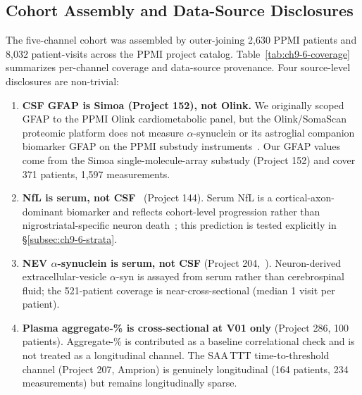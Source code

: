 \subsection{Cohort Assembly and Data-Source Disclosures}
\label{subsec:ch9-6-cohort}

The five-channel cohort was assembled by outer-joining 2,630 PPMI patients and 8,032 patient-visits across the PPMI project catalog. Table~\ref{tab:ch9-6-coverage} summarizes per-channel coverage and data-source provenance. Four source-level disclosures are non-trivial:

\begin{enumerate}
\item \textbf{CSF GFAP is Simoa (Project 152), not Olink.} We originally scoped GFAP to the PPMI Olink cardiometabolic panel, but the Olink/SomaScan proteomic platform does not measure $\alpha$-synuclein or its astroglial companion biomarker GFAP on the PPMI substudy instruments~\cite{rutledge2024}. Our GFAP values come from the Simoa single-molecule-array substudy (Project 152) and cover 371 patients, 1,597 measurements.
\item \textbf{NfL is serum, not CSF}~\cite{backstrom2020nfl} (Project 144). Serum NfL is a cortical-axon-dominant biomarker and reflects cohort-level progression rather than nigrostriatal-specific neuron death~\cite{sampedro2020nfl}; this prediction is tested explicitly in \S\ref{subsec:ch9-6-strata}.
\item \textbf{NEV $\alpha$-synuclein is serum, not CSF} (Project 204,~\cite{yan2023nev}). Neuron-derived extracellular-vesicle $\alpha$-syn is assayed from serum rather than cerebrospinal fluid; the 521-patient coverage is near-cross-sectional (median 1 visit per patient).
\item \textbf{Plasma aggregate-\% is cross-sectional at V01 only} (Project 286, 100 patients). Aggregate-\% is contributed as a baseline correlational check and is not treated as a longitudinal channel. The SAA\,TTT time-to-threshold channel (Project 207, Amprion) is genuinely longitudinal (164 patients, 234 measurements) but remains longitudinally sparse.
\end{enumerate}

